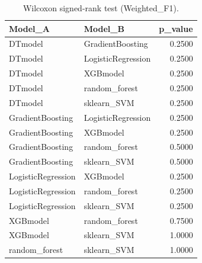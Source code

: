 \begin{table}[t]
\centering
\begin{tabular}{llr}
\toprule
Model_A & Model_B & p_value \\
\midrule
DTmodel & GradientBoosting & 0.2500 \\
DTmodel & LogisticRegression & 0.2500 \\
DTmodel & XGBmodel & 0.2500 \\
DTmodel & random_forest & 0.2500 \\
DTmodel & sklearn_SVM & 0.2500 \\
GradientBoosting & LogisticRegression & 0.2500 \\
GradientBoosting & XGBmodel & 0.2500 \\
GradientBoosting & random_forest & 0.5000 \\
GradientBoosting & sklearn_SVM & 0.5000 \\
LogisticRegression & XGBmodel & 0.2500 \\
LogisticRegression & random_forest & 0.2500 \\
LogisticRegression & sklearn_SVM & 0.2500 \\
XGBmodel & random_forest & 0.7500 \\
XGBmodel & sklearn_SVM & 1.0000 \\
random_forest & sklearn_SVM & 1.0000 \\
\bottomrule
\end{tabular}
\caption{Wilcoxon signed-rank test (Weighted_F1).}
\label{tab:wilcoxon_Weighted_F1}
\end{table}